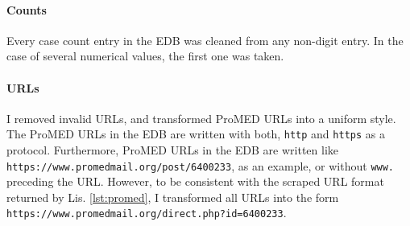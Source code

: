   \paragraph{Counts}
    Every case count entry in the EDB was cleaned from any non-digit entry.
    In the case of several numerical values, the first one was taken.

  \paragraph{URLs}
    I removed invalid URLs, and transformed ProMED URLs into a uniform style. The ProMED URLs in the EDB are written with both, \texttt{http} and \texttt{https} as a protocol. Furthermore, ProMED URLs in the EDB are written like \textquotesingle \texttt{https://\allowbreak www.promedmail.org\allowbreak /post\allowbreak /6400233}\textquotesingle , as an example, or without \texttt{www.} preceding the URL. However, to be consistent with the scraped URL format returned by Lis. \ref{lst:promed}, I transformed all URLs into the form \textquotesingle \texttt{https://\allowbreak www.promedmail.org/\allowbreak direct.php?id=6400233}\textquotesingle.


